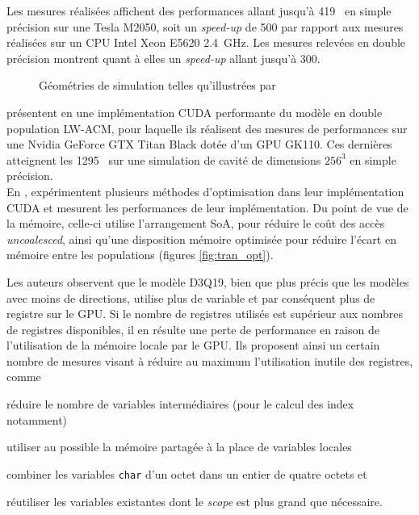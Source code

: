 Les mesures réalisées affichent des performances allant jusqu'à 419~ en simple précision sur une  Tesla M2050, soit un \textit{speed-up} de 500 par rapport aux mesures réalisées sur un \acs{CPU} Intel Xeon E5620 2.4~GHz. Les mesures relevées en double précision montrent quant à elles un \textit{speed-up} allant jusqu'à 300.\\
\begin{figure}[H]
	\centering
	\caption{Géométries de simulation telles qu'illustrées par \cite{campos_lattice_2016}}
	\label{fig:campos_domaine}
\end{figure} 

\citet{obrecht_thermal_2016} présentent en \citeyear{obrecht_thermal_2016} une implémentation CUDA performante du modèle en double population LW-ACM, pour laquelle ils réalisent des mesures de performances sur une Nvidia GeForce GTX Titan Black dotée d'un \acs{GPU} GK110. Ces dernières atteignent les 1295~ sur une simulation de cavité de dimensions $256^3$ en simple précision. \\

En \citeyear{tran_performance_2017}, \citet{tran_performance_2017} expérimentent plusieurs méthodes d'optimisation dans leur implémentation CUDA et mesurent les performances de leur implémentation. Du point de vue de la mémoire, celle-ci utilise l'arrangement SoA, pour réduire le coût des accès \textit{uncoalesced}, ainsi qu'une disposition mémoire optimisée pour réduire l'écart en mémoire entre les populations (figures \ref{fig:tran_opt}).

Les auteurs observent que le modèle D3Q19, bien que plus précis que les modèles avec moins de directions, utilise plus de variable et par conséquent plus de registre sur le \acs{GPU}. Si le nombre de registres utilisés est supérieur aux nombres de registres disponibles, il en résulte une perte de performance en raison de l'utilisation de la mémoire locale par le \acs{GPU}. Ils proposent ainsi un certain nombre de mesures visant à réduire au maximum l'utilisation inutile des registres, comme 
\begin{enumerate*}[label=\alph*.]
	\item réduire le nombre de variables intermédiaires (pour le calcul des index notamment)
	\item utiliser au possible la mémoire partagée à la place de variables locales 
	\item combiner les variables \texttt{char} d'un octet dans un entier de quatre octets et
	\item réutiliser les variables existantes dont le \textit{scope} est plus grand que nécessaire.
\end{enumerate*}

